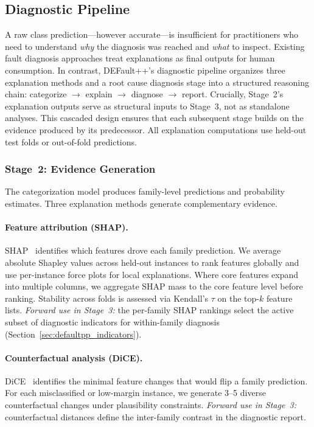 \subsection{Diagnostic Pipeline}
\label{sec:defaultpp_reasoning}

A raw class prediction---however accurate---is insufficient for practitioners who need to understand \emph{why} the diagnosis was reached and \emph{what} to inspect. Existing fault diagnosis approaches treat explanations as final outputs for human consumption. In contrast, DEFault++'s diagnostic pipeline organizes three explanation methods and a root cause diagnosis stage into a structured reasoning chain: categorize $\rightarrow$ explain $\rightarrow$ diagnose $\rightarrow$ report. Crucially, Stage~2's explanation outputs serve as structural inputs to Stage~3, not as standalone analyses. This cascaded design ensures that each subsequent stage builds on the evidence produced by its predecessor. All explanation computations use held-out test folds or out-of-fold predictions.

\subsubsection{Stage~2: Evidence Generation}
\label{sec:defaultpp_evidence}

The categorization model produces family-level predictions and probability estimates. Three explanation methods generate complementary evidence.

\paragraph{Feature attribution (SHAP).}
SHAP~\cite{lundberg2017unified} identifies which features drove each family prediction. We average absolute Shapley values across held-out instances to rank features globally and use per-instance force plots for local explanations. Where core features expand into multiple columns, we aggregate SHAP mass to the core feature level before ranking. Stability across folds is assessed via Kendall's $\tau$ on the top-$k$ feature lists. \textit{Forward use in Stage~3:} the per-family SHAP rankings select the active subset of diagnostic indicators for within-family diagnosis (Section~\ref{sec:defaultpp_indicators}).

\paragraph{Counterfactual analysis (DiCE).}
DiCE~\cite{mothilal2020dice} identifies the minimal feature changes that would flip a family prediction. For each misclassified or low-margin instance, we generate 3--5 diverse counterfactual changes under plausibility constraints. \textit{Forward use in Stage~3:} counterfactual distances define the inter-family contrast in the diagnostic report.

